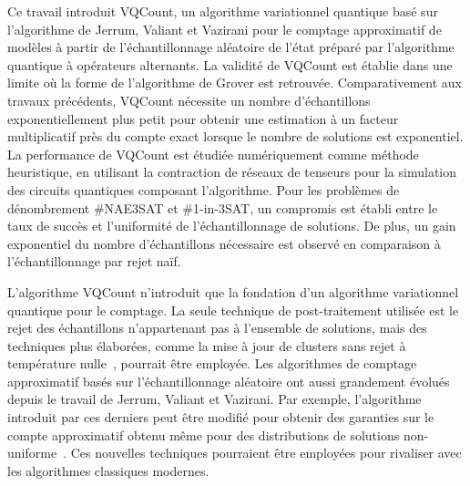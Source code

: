 \Conclusion %


Ce travail introduit VQCount, un algorithme variationnel quantique basé sur l'algorithme de Jerrum, Valiant et Vazirani pour le comptage approximatif de modèles à partir de l'échantillonnage aléatoire de l'état préparé par l'algorithme quantique à opérateurs alternants. La validité de VQCount est établie dans une limite où la forme de l'algorithme de Grover est retrouvée. Comparativement aux travaux précédents, VQCount nécessite un nombre d'échantillons exponentiellement plus petit pour obtenir une estimation à un facteur multiplicatif près du compte exact lorsque le nombre de solutions est exponentiel. La performance de VQCount est étudiée numériquement comme méthode heuristique, en utilisant la contraction de réseaux de tenseurs pour la simulation des circuits quantiques composant l'algorithme. Pour les problèmes de dénombrement \#NAE3SAT et \#1-in-3SAT, un compromis est établi entre le taux de succès et l'uniformité de l'échantillonnage de solutions. De plus, un gain exponentiel du nombre d'échantillons nécessaire est observé en comparaison à l'échantillonnage par rejet naïf.  

L'algorithme VQCount n'introduit que la fondation d'un algorithme variationnel quantique pour le comptage. La seule technique de post-traitement utilisée est le rejet des échantillons n'appartenant pas à l'ensemble de solutions, mais des techniques plus élaborées, comme la mise à jour de clusters sans rejet à température nulle~\cite{ochoaFeedingMultitudePolynomialtime2019}, pourrait être employée. Les algorithmes de comptage approximatif basés sur l'échantillonnage aléatoire ont aussi grandement évolués depuis le travail de Jerrum, Valiant et Vazirani. Par exemple, l'algorithme introduit par ces derniers peut être modifié pour obtenir des garanties sur le compte approximatif obtenu même pour des distributions de solutions non-uniforme~\cite{gomesSamplingModelCounting2007}. Ces nouvelles techniques pourraient être employées pour rivaliser avec les algorithmes classiques modernes.


